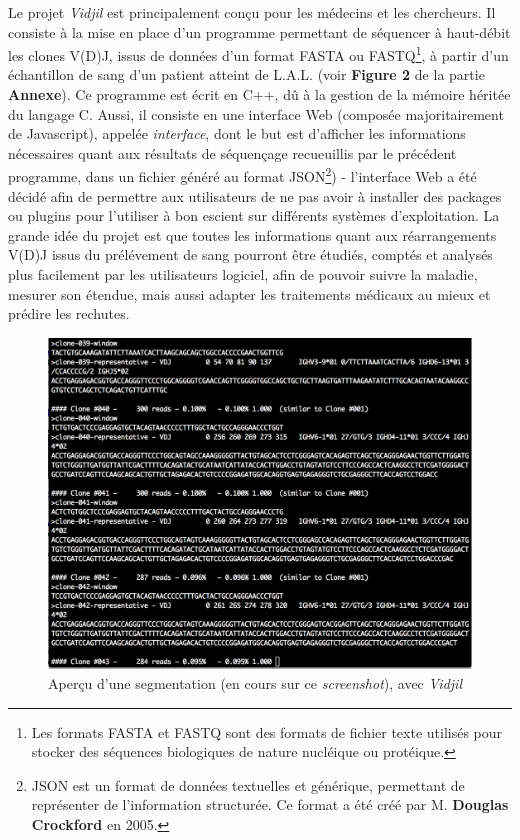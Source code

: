 \documentclass[pdftex,12pt,a4paper]{report}
\begin{document}
\begin{spacing}{1.2}
Le projet \textit{Vidjil} est principalement conçu pour les médecins et les chercheurs.
\newline 
Il consiste à la mise en place d'un programme permettant de séquencer à haut-débit les clones V(D)J, issus de données d'un format FASTA ou FASTQ\footnote{Les formats FASTA et FASTQ sont des formats de fichier texte utilisés pour stocker des séquences biologiques de nature nucléique ou protéique.}, à partir d'un échantillon de sang d'un patient atteint de L.A.L. (voir \textbf{Figure 2} de la partie \textbf{Annexe}). Ce programme est écrit en C++, dû à la gestion de la mémoire héritée du langage C. Aussi, il consiste en une interface Web (composée majoritairement de Javascript), appelée \textit{interface}, dont le but est d'afficher les informations nécessaires quant aux résultats de séquençage recueuillis par le précédent programme, dans un fichier généré au format JSON\footnote{JSON est un format de données textuelles et générique, permettant de représenter de l'information structurée. Ce format a été créé par M. \textbf{Douglas Crockford} en 2005.}) - l'interface Web a été décidé afin de permettre aux utilisateurs de ne pas avoir à installer des packages ou plugins pour l'utiliser à bon escient sur différents systèmes d'exploitation.
\newline
La grande idée du projet est que toutes les informations quant aux réarrangements V(D)J issus du prélévement de sang pourront être étudiés, comptés et analysés plus facilement par les utilisateurs logiciel, afin de pouvoir suivre la maladie, mesurer son étendue, mais aussi adapter les traitements médicaux au mieux et prédire les rechutes.

\begin{figure}[H]
\begin{center}
	\includegraphics[scale=0.6]{img/C++-Ex.jpg}
\end{center}
\caption{Aperçu d'une segmentation (en cours sur ce \textit{screenshot}), avec \textit{Vidjil}}
\end{figure}


\end{spacing}
\end{document}
